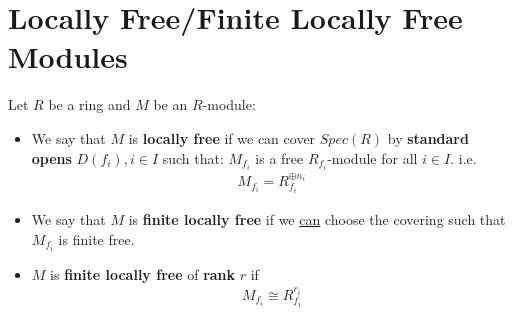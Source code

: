 \documentclass[Total.tex]{subfiles}
\begin{document}
		\section{Locally Free/Finite Locally Free Modules}
			\begin{Def}
				Let $R$ be a ring and $M$ be an $R$-module:
				\begin{itemize}
					\item We say that $M$ is \textbf{locally free} if we can cover $Spec(R)$ by \textbf{standard opens} $D(f_i),i\in I$ such that: $M_{f_i}$ is a free $R_{f_i}$-module for all $i\in I$. i.e.
					\begin{gather*}
						M_{f_i}=R_{f_i}^{\oplus n_i}
					\end{gather*}
					\item We say that $M$ is \textbf{finite locally free} if we \underline{can} choose the covering such that $M_{f_i}$ is finite free.
					\item $M$ is \textbf{finite locally free} of \textbf{rank} $r$ if
					\begin{gather*}
						M_{f_i}\cong R_{f_i}^{r_i}
					\end{gather*}
				\end{itemize}
			\end{Def}
			
\end{document}
